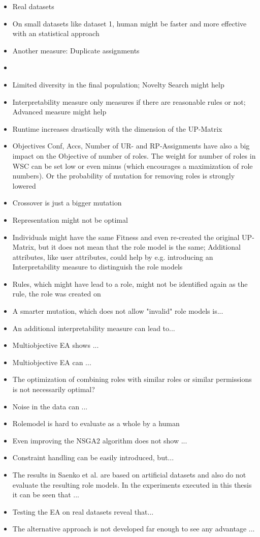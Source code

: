 \begin{itemize}
    \item Real datasets
    \item On small datasets like dataset 1, human might be faster and more effective with an statistical approach
    \item Another measure: Duplicate assignments
    \item 
    \item Limited diversity in the final population; Novelty Search might help
    \item Interpretability measure only measures if there are reasonable rules or not; Advanced measure might help
    \item Runtime increases drastically with the dimension of the UP-Matrix
    \item Objectives Conf, Accs, Number of UR- and RP-Assignments have also a big impact on the Objective of number of roles. The weight for number of roles in WSC can be set low or even minus (which encourages a maximization of role numbers). Or the probability of mutation for removing roles is strongly lowered
    \item Crossover is just a bigger mutation
    \item Representation might not be optimal
    \item Individuals might have the same Fitness and even re-created the original UP-Matrix, but it does not mean that the role model is the same; Additional attributes, like user attributes, could help by e.g. introducing an Interpretability measure to distinguish the role models
    \item Rules, which might have lead to a role, might not be identified again as the rule, the role was created on
    \item A smarter mutation, which does not allow "invalid" role models is...
    \item An additional interpretability measure can lead to...
    \item Multiobjective EA shows ...
    \item Multiobjective EA can ...
    \item The optimization of combining roles with similar roles or similar permissions is not necessarily optimal?
    \item Noise in the data can ...
    \item Rolemodel is hard to evaluate as a whole by a human
    \item Even improving the NSGA2 algorithm does not show ...
    \item Constraint handling can be easily introduced, but...
    \item The results in Saenko et al. are based on artificial datasets and also do not evaluate the resulting role models. In the experiments executed in this thesis it can be seen that ...
    \item Testing the EA on real datasets reveal that...
    \item The alternative approach is not developed far enough to see any advantage ...
\end{itemize}

